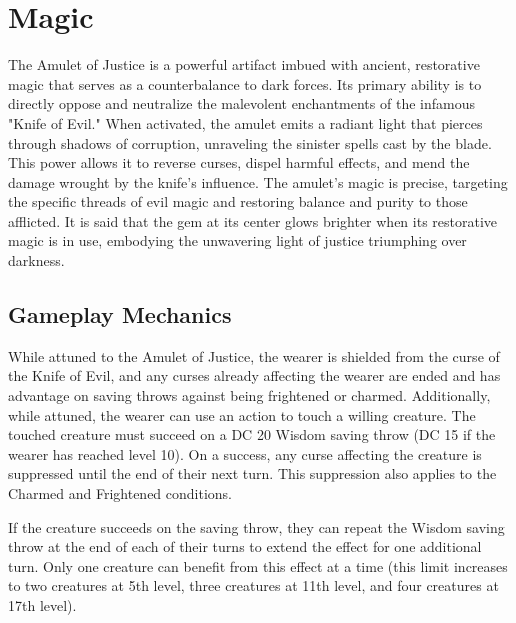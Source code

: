 \vfill\eject

\section*{Magic}
{\entryfont The Amulet of Justice is a powerful artifact imbued with ancient, restorative magic that serves as a counterbalance to dark forces. Its primary ability is to directly oppose and neutralize the malevolent enchantments of the infamous "Knife of Evil." When activated, the amulet emits a radiant light that pierces through shadows of corruption, unraveling the sinister spells cast by the blade. This power allows it to reverse curses, dispel harmful effects, and mend the damage wrought by the knife's influence. The amulet's magic is precise, targeting the specific threads of evil magic and restoring balance and purity to those afflicted. It is said that the gem at its center glows brighter when its restorative magic is in use, embodying the unwavering light of justice triumphing over darkness.}

\subsection*{Gameplay Mechanics}
{\entryfont While attuned to the Amulet of Justice, the wearer is shielded from the curse of the Knife of Evil, and any curses already affecting the wearer are ended and has advantage on saving throws against being frightened or charmed. Additionally, while attuned, the wearer can use an action to touch a willing creature. The touched creature must succeed on a DC 20 Wisdom saving throw (DC 15 if the wearer has reached level 10). On a success, any curse affecting the creature is suppressed until the end of their next turn. This suppression also applies to the Charmed and Frightened conditions.

If the creature succeeds on the saving throw, they can repeat the Wisdom saving throw at the end of each of their turns to extend the effect for one additional turn. Only one creature can benefit from this effect at a time (this limit increases to two creatures at 5th level, three creatures at 11th level, and four creatures at 17th level).}